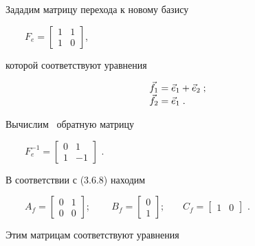 \documentclass[a4paper]{article}
\begin{document}
{\begin{russian}\sffamily
Зададим матрицу перехода к новому базису
\end{russian}}

{\begin{russian}\sffamily
\ \ \ \  $F_e=\left[\begin{matrix}1&1\\1&0\end{matrix}\right]$,
\end{russian}}

{\begin{russian}\sffamily
которой соответствуют уравнения 
\end{russian}}

\begin{equation*}
\begin{matrix}\vec f_1=\vec e_1+\vec e_2\;;\hfill\null \\\vec f_2=\vec e_1\;.\hfill\null \end{matrix}\hfill 
\end{equation*}
{\begin{russian}\sffamily
Вычислим \ обратную матрицу 
\end{russian}}

{\begin{russian}\sffamily
\ \ \ \  $F_e^{-1}=\left[\begin{matrix}0&1\\1&-1\end{matrix}\right]$ .
\end{russian}}

{\begin{russian}\sffamily
В соответствии с (3.6.8) находим
\end{russian}}

{\begin{russian}\sffamily
\ \ \ \  $A_f=\left[\begin{matrix}0&1\\0&0\end{matrix}\right]$; \ \ \ \ 
$B_f=\left[\begin{matrix}0\\1\end{matrix}\right];$ \ \ \  $C_f=\left[\begin{matrix}1&0\end{matrix}\right]$ .
\end{russian}}

{\begin{russian}\sffamily
Этим матрицам соответствуют уравнения
\end{russian}}
\end{document}
